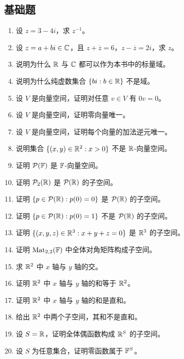 \subsection*{基础题} \begin{enumerate}[label=\textbf{\arabic*.}]
\item \basic 设 $z=3-4i$，求 $z^{-1}$。 \item \basic 设 $z=a+bi\in\mathbb{C}$，且 $z+\overline z=6$，$z-\overline z=2i$，求 $z$。
\item \basic 说明为什么 $\mathbb{R}$ 与 $\mathbb{C}$ 都可以作为本书中的标量域。 \item \basic 说明为什么纯虚数集合 $\{bi:b\in\mathbb{R}\}$ 不是域。
\item \basic 设 $V$ 是向量空间，证明对任意 $v\in V$ 有 $0v=0$。 \item \basic 设 $V$ 是向量空间，证明零向量唯一。
\item \basic 设 $V$ 是向量空间，证明每个向量的加法逆元唯一。 \item \basic 说明集合 $\{(x,y)\in\mathbb{R}^2:x>0\}$ 不是 $\mathbb{R}$-向量空间。
\item \basic 证明 $\mathcal{P}(\mathbb{F})$ 是 $\mathbb{F}$-向量空间。 \item \basic 证明 $\mathcal{P}_2(\mathbb{R})$ 是 $\mathcal{P}(\mathbb{R})$ 的子空间。
\item \basic 证明 $\{p\in\mathcal{P}(\mathbb{R}):p(0)=0\}$ 是 $\mathcal{P}(\mathbb{R})$ 的子空间。 \item \basic 证明 $\{p\in\mathcal{P}(\mathbb{R}):p(0)=1\}$ 不是 $\mathcal{P}(\mathbb{R})$ 的子空间。
\item \basic 证明 $\{(x,y,z)\in\mathbb{R}^3:x+y+z=0\}$ 是 $\mathbb{R}^3$ 的子空间。 \item \basic 证明 $\mathrm{Mat}_{2,2}(\mathbb{F})$ 中全体对角矩阵构成子空间。
\item \basic 求 $\mathbb{R}^2$ 中 $x$ 轴与 $y$ 轴的交。 \item \basic 证明 $\mathbb{R}^2$ 中 $x$ 轴与 $y$ 轴的和等于 $\mathbb{R}^2$。
\item \basic 证明 $\mathbb{R}^2$ 中 $x$ 轴与 $y$ 轴的和是直和。 \item \basic 给出 $\mathbb{R}^2$ 中两个子空间，其和不是直和。
\item \basic 设 $S=\mathbb{R}$，证明全体偶函数构成 $\mathbb{R}^S$ 的子空间。 \item \basic 设 $S$ 为任意集合，证明零函数属于 $\mathbb{F}^S$。
\end{enumerate}


